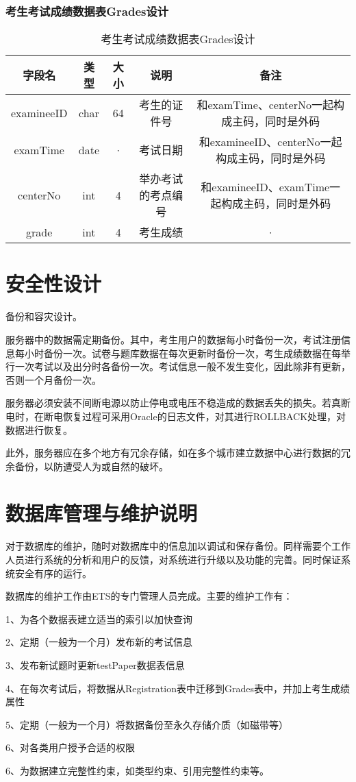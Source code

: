 \subsubsection{考生考试成绩数据表Grades设计}
\begin{table}[htbp]
\centering
\caption{考生考试成绩数据表Grades设计} \label{tab:order-database}
\begin{tabular}{|c|c|c|c|c|}
    \hline
    字段名 & 类型 & 大小 & 说明 & 备注 \\
    \hline
    examineeID & char & 64 & 考生的证件号 & 和examTime、centerNo一起构成主码，同时是外码 \\
    \hline
    examTime & date & · & 考试日期 & 和examineeID、centerNo一起构成主码，同时是外码 \\
    \hline
    centerNo & int & 4 & 举办考试的考点编号 & 和examineeID、examTime一起构成主码，同时是外码 \\
    \hline
    grade & int & 4 & 考生成绩 & · \\
    \hline
\end{tabular}
\end{table}



\section{安全性设计}
备份和容灾设计。

服务器中的数据需定期备份。其中，考生用户的数据每小时备份一次，考试注册信息每小时备份一次。试卷与题库数据在每次更新时备份一次，考生成绩数据在每举行一次考试以及出分时各备份一次。考试信息一般不发生变化，因此除非有更新，否则一个月备份一次。

服务器必须安装不间断电源以防止停电或电压不稳造成的数据丢失的损失。若真断电时，在断电恢复过程可采用Oracle的日志文件，对其进行ROLLBACK处理，对数据进行恢复。

此外，服务器应在多个地方有冗余存储，如在多个城市建立数据中心进行数据的冗余备份，以防遭受人为或自然的破坏。

\section{数据库管理与维护说明}
对于数据库的维护，随时对数据库中的信息加以调试和保存备份。同样需要个工作人员进行系统的分析和用户的反馈，对系统进行升级以及功能的完善。同时保证系统安全有序的运行。

数据库的维护工作由ETS的专门管理人员完成。主要的维护工作有：

1、为各个数据表建立适当的索引以加快查询

2、定期（一般为一个月）发布新的考试信息

3、发布新试题时更新testPaper数据表信息

4、在每次考试后，将数据从Registration表中迁移到Grades表中，并加上考生成绩属性

5、定期（一般为一个月）将数据备份至永久存储介质（如磁带等）

6、对各类用户授予合适的权限

6、为数据建立完整性约束，如类型约束、引用完整性约束等。